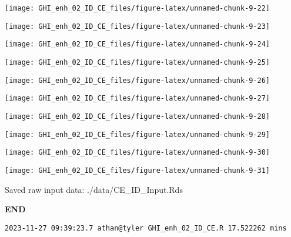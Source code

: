 \documentclass[
  10pt,
  a4paper,oneside]{article}
\begin{document}
\begin{center}\texttt{[image: GHI\_enh\_02\_ID\_CE\_files/figure-latex/unnamed-chunk-9-22]} \end{center}

\begin{center}\texttt{[image: GHI\_enh\_02\_ID\_CE\_files/figure-latex/unnamed-chunk-9-23]} \end{center}

\begin{center}\texttt{[image: GHI\_enh\_02\_ID\_CE\_files/figure-latex/unnamed-chunk-9-24]} \end{center}

\begin{center}\texttt{[image: GHI\_enh\_02\_ID\_CE\_files/figure-latex/unnamed-chunk-9-25]} \end{center}

\begin{center}\texttt{[image: GHI\_enh\_02\_ID\_CE\_files/figure-latex/unnamed-chunk-9-26]} \end{center}

\begin{center}\texttt{[image: GHI\_enh\_02\_ID\_CE\_files/figure-latex/unnamed-chunk-9-27]} \end{center}

\begin{center}\texttt{[image: GHI\_enh\_02\_ID\_CE\_files/figure-latex/unnamed-chunk-9-28]} \end{center}

\begin{center}\texttt{[image: GHI\_enh\_02\_ID\_CE\_files/figure-latex/unnamed-chunk-9-29]} \end{center}

\begin{center}\texttt{[image: GHI\_enh\_02\_ID\_CE\_files/figure-latex/unnamed-chunk-9-30]} \end{center}

\begin{center}\texttt{[image: GHI\_enh\_02\_ID\_CE\_files/figure-latex/unnamed-chunk-9-31]} \end{center}

Saved raw input data: ./data/CE\_ID\_Input.Rds

\textbf{END}

\begin{verbatim}
2023-11-27 09:39:23.7 athan@tyler GHI_enh_02_ID_CE.R 17.522262 mins
\end{verbatim}
\end{document}
